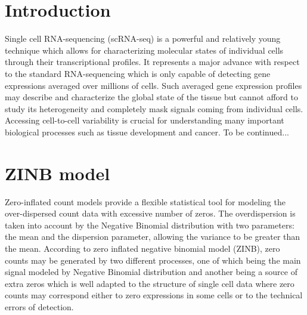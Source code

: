 \documentclass[12pt,a4paper]{article}
\begin{document}
\section{Introduction}
Single cell RNA-sequencing (scRNA-seq) is a powerful and relatively young technique which allows for characterizing molecular states of individual cells through their transcriptional profiles. It represents a major advance with respect to the standard RNA-sequencing which is only capable of detecting gene expressions averaged over millions of cells. Such averaged gene expression profiles may describe and characterize the global state of the tissue but cannot afford to study its heterogeneity and completely mask signals coming from individual cells. Accessing cell-to-cell variability is crucial for understanding many important biological processes such as tissue development and cancer. To be continued...

\section{ZINB model}

Zero-inflated count models provide a flexible statistical tool for modeling the over-dispersed count data with excessive number of zeros. The overdispersion is taken into account by the Negative Binomial distribution with two parameters: the mean and  the dispersion parameter, allowing the variance to be greater than the mean. According to zero inflated negative binomial model (ZINB), zero counts may be generated by two different processes, one of which being the main signal modeled by Negative Binomial distribution and another being a source of extra zeros which is well adapted to the structure of single cell data where zero counts may correspond either to zero expressions in some cells or to the technical errors of detection. 
\end{document}
